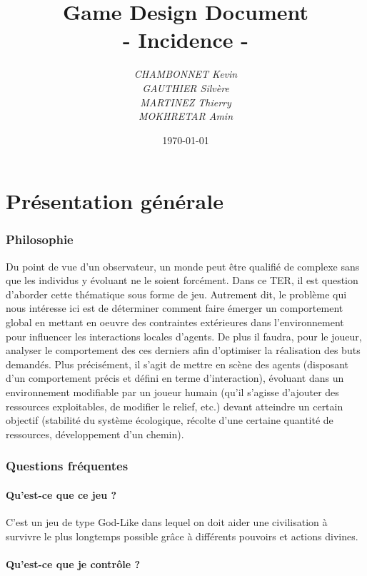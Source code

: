 \documentclass[a4paper]{article}
\title{\textbf{Game Design Document}\\- \Huge{Incidence} -}
\author{\emph{CHAMBONNET Kevin}\\\emph{GAUTHIER Silvère}\\\emph{MARTINEZ Thierry}\\\emph{MOKHRETAR Amin}}
\date{\today}
\begin{document}
  \maketitle
  \newpage
  \tableofcontents


  \newpage
  \part{Présentation générale}
    \section{Philosophie}

      Du point de vue d’un observateur, un monde peut être qualifié de complexe sans que les individus y évoluant ne le soient forcément. Dans ce TER, il est question d’aborder cette thématique sous forme de jeu. Autrement dit, le problème qui nous intéresse ici est de déterminer comment faire émerger un comportement global en mettant en oeuvre des contraintes extérieures dans l’environnement pour influencer les interactions locales d’agents. De plus il faudra, pour le joueur, analyser le comportement des ces derniers afin d’optimiser la réalisation des buts demandés. Plus précisément, il s’agit de mettre en scène des agents (disposant d’un comportement précis et défini en terme d’interaction), évoluant dans un environnement modifiable par un joueur humain (qu’il s’agisse d’ajouter des ressources exploitables, de modifier le relief, etc.) devant atteindre un certain objectif (stabilité du système écologique, récolte d’une certaine quantité de ressources, développement d’un chemin).

    \section{Questions fréquentes}
		\subsection{Qu'est-ce que ce jeu ?}
			
			C'est un jeu de type God-Like dans lequel on doit aider une civilisation à survivre le plus longtemps possible grâce à différents pouvoirs et actions divines.
			
		\subsection{Qu'est-ce que je contrôle ?}
			
\end{document}
